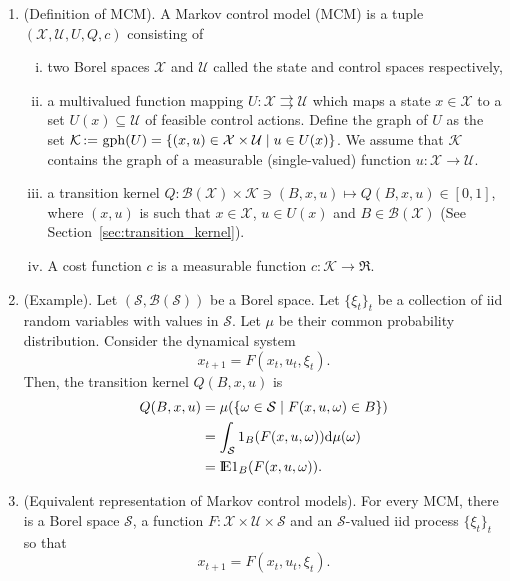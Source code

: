 \documentclass[a4paper,10pt]{scrbook}
\begin{document}
\begin{enumerate}
 \item (Definition of MCM). 
       A Markov control model (MCM) is a tuple
       \(\left(\mathcal{X},\mathcal{U}, U, Q, c\right)\) consisting of 
       \begin{enumerate}[i.]
        \item two Borel spaces $\mathcal{X}$ and $\mathcal{U}$ called the state and control spaces respectively,
        
        \item a multivalued function mapping $U:\mathcal{X} \rightrightarrows \mathcal{U}$ which maps
              a state $x\in\mathcal{X}$ to a set $U(x)\subseteq \mathcal{U}$ of feasible control actions.
              Define the graph of $U$ as the set
	      $\mathcal{K} {}\mathop{\mathrel{:}=}{} \operatorname{gph}(U)=\{(x,u)\in \mathcal{X}\times \mathcal{U} \mid u\in U(x)\}$.
	      We assume that $\mathcal{K}$ contains the graph of a measurable (single-valued) function $u:\mathcal{X}\to\mathcal{U}$.
	      
        \item a transition kernel 
              $Q:\mathcal{B}(\mathcal{X})\times \mathcal{K}\ni(B,x,u)\mapsto Q(B, x, u)\in [0,1]$, where $(x,u)$ 
              is such that $x\in\mathcal{X}$, $u\in U(x)$ and $B\in\mathcal{B}(\mathcal{X})$ (See Section~\ref{sec:transition_kernel}).              
              
	\item A cost function $c$ is a measurable function $c:\mathcal{K}\to \Re$.
       \end{enumerate}
 \item (Example). Let $(\mathcal{S}, \mathcal{B}(\mathcal{S}))$ be a Borel space. 
	Let $\{\xi_t\}_t$ be a collection of iid random variables with values in $\mathcal{S}$.
	Let $\mu$ be their common probability distribution. Consider the dynamical system
	\[
	  x_{t+1} = F(x_t, u_t, \xi_t).
	\]
	Then, the transition kernel $Q(B,x,u)$ is
	\begin{align*}
	  Q(B,x,u) &= \mu(\{\omega \in \mathcal{S} \mid F(x,u,\omega)\in B\})\\
	  &= \int_{\mathcal{S}}1_{B}(F(x,u,\omega))\d\mu(\omega)\\
	  &= \E 1_{B}(F(x,u,\omega)).
	\end{align*}
 \item (Equivalent representation of Markov control models).
	For every MCM, there is a Borel space $\mathcal{S}$, a function 
	$F:\mathcal{X}\times\mathcal{U}\times\mathcal{S}$ and an $\mathcal{S}$-valued 
	iid process $\{\xi_t\}_t$ so that
	\[
	 x_{t+1} = F(x_t, u_t, \xi_t).
	\]


\end{enumerate}
\end{document}

